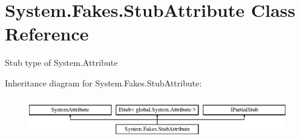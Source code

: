 \hypertarget{class_system_1_1_fakes_1_1_stub_attribute}{\section{System.\-Fakes.\-Stub\-Attribute Class Reference}
\label{class_system_1_1_fakes_1_1_stub_attribute}
}


Stub type of System.\-Attribute 


Inheritance diagram for System.\-Fakes.\-Stub\-Attribute\-:\begin{figure}[H]
\begin{center}
\leavevmode
\includegraphics[height=1.857380cm]{class_system_1_1_fakes_1_1_stub_attribute}
\end{center}
\end{figure}

